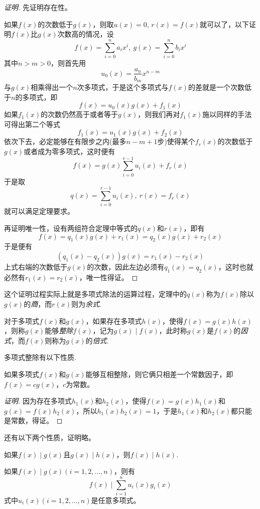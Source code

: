 \begin{proof}[证明]
  先证明存在性。
  
  如果$f(x)$的次数低于$g(x)$，则取$u(x)=0$, $r(x)=f(x)$就可以了，以下证明$f(x)$比$g(x)$次数高的情况，设
  \[ f(x)=\sum_{i=0}^na_ix^i, \   g(x)=\sum_{i=0}^nb_ix^i \]
  其中$n>m>0$，则首先用
  \[ u_0(x)=\frac{a_n}{b_m}x^{n-m} \]
  与$g(x)$相乘得出一个$n$次多项式，于是这个多项式与$f(x)$的差就是一个次数低于$n$的多项式，即
  \[ f(x) = u_0(x) g(x) + f_1(x) \]
  如果$f_1(x)$的次数仍然高于或者等于$g(x)$，则我们再对$f_1(x)$施以同样的手法可得出第二个等式
  \[ f_1(x) = u_1(x)g(x) + f_2(x) \]
  依次下去，必定能够在有限步之内(最多$n-m+1$步)使得某个$f_r(x)$的次数低于$g(x)$或者成为零多项式，这时便有
  \[ f(x) = g(x) \sum_{i=0}^{r-1}u_i(x) + f_r(x) \]
  于是取
  \[ q(x)=\sum_{i=0}^{r-1}u_i(x), \  r(x)=f_r(x) \]
  就可以满足定理要求。

  再证明唯一性，设有两组符合定理中等式的$q(x)$和$r(x)$，即有
  \[ f(x) = q_1(x)g(x)+r_1(x) = q_2(x)g(x)+r_2(x) \]
  于是便有
  \[ (q_1(x)-q_2(x)) g(x) = r_1(x)-r_2(x) \]
  上式右端的次数低于$g(x)$的次数，因此左边必须有$q_1(x)=q_2(x)$，这时也就必然有$r_1(x)=r_2(x)$，唯一性得证。
\end{proof}

这个证明过程实际上就是多项式除法的运算过程，定理中的$q(x)$称为$f(x)$除以$g(x)$的\emph{商}，而$r(x)$则为\emph{余式}.

\begin{definition}
  对于多项式$f(x)$和$g(x)$，如果存在多项式$h(x)$，使得$f(x)=g(x)h(x)$，则称$g(x)$能够\emph{整除}$f(x)$，记为$g(x) \mid f(x)$，此时称$g(x)$是$f(x)$的\emph{因式}，而$f(x)$则称为$g(x)$的\emph{倍式}.
\end{definition}

多项式整除有以下性质.
\begin{property}
  如果多项式$f(x)$和$g(x)$能够互相整除，则它俩只相差一个常数因子，即$f(x)=cg(x)$，$c$为常数。
\end{property}

\begin{proof}[证明]
  因为存在多项式$h_1(x)$和$h_2(x)$，使得$f(x)=g(x)h_1(x)$和$g(x)=f(x)h_2(x)$，所以$h_1(x)h_2(x)=1$，于是$h_1(x)$和$h_2(x)$都只能是常数，得证。
\end{proof}

还有以下两个性质，证明略。
\begin{property}
  如果$f(x) \mid g(x)$且$g(x) \mid h(x)$，则$f(x) \mid h(x)$.
\end{property}

\begin{property}
  如果$f(x) \mid g(x)(i=1,2,\ldots,n)$，则有
  \[ f(x) \mid \sum_{i=1}^n u_i(x)g_i(x) \]
  式中$u_i(x)(i=1,2,\ldots,n)$是任意多项式。
\end{property}

